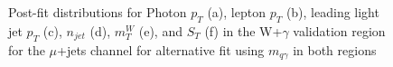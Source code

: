 \begin{figure}[]
\hfil  
{}
\caption{Post-fit distributions for Photon $p_T$ (a), lepton $p_T$ (b), leading light jet $p_T$ (c), $n_{jet}$ (d), $m_T^W$ (e), and $S_T$ (f) in the W+$\gamma$ validation region for the $\mu$+jets channel for alternative fit using  $m_{q\gamma}$ in both regions}
\end{figure}


